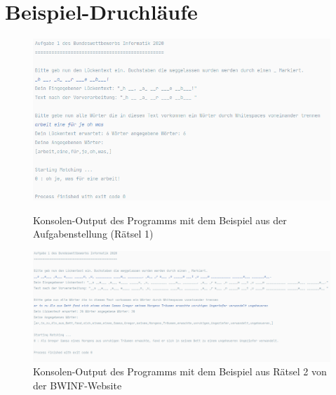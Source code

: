 \documentclass{article}
\begin{document}
\newpage

\section*{Beispiel-Druchläufe}

\begin{figure}[h]
	\center
	\includegraphics[width=1.05\textwidth]{aufgabe_example_ver1.png}
	\caption{Konsolen-Output des Programms mit dem Beispiel aus der Aufgabenstellung (Rätsel 1)}
	
	\vspace{0.5cm}
	\includegraphics[width=1.05\textwidth]{aufgabe_example.png}
	\caption{Konsolen-Output des Programms mit dem Beispiel aus Rätsel 2 von der BWINF-Website}
\end{figure}
\end{document}

